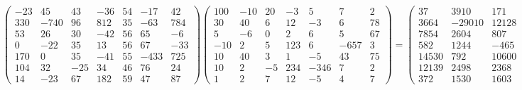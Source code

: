 \documentclass{article}%
\begin{document}
\[%
\begin{pmatrix}%
-23&45&43&-36&54&-17&42\\%
330&-740&96&812&35&-63&784\\%
53&26&30&-42&56&65&-6\\%
0&-22&35&13&56&67&-33\\%
170&0&35&-41&55&-433&725\\%
104&32&-25&34&46&76&24\\%
14&-23&67&182&59&47&87%
\end{pmatrix} \begin{pmatrix}%
100&-10&20&-3&5&7&2\\%
30&40&6&12&-3&6&78\\%
5&-6&0&2&6&5&67\\%
-10&2&5&123&6&-657&3\\%
10&40&3&1&-5&43&75\\%
10&2&-5&234&-346&7&2\\%
1&2&7&12&-5&4&7%
\end{pmatrix} = \begin{pmatrix}%
37&3910&171&-7153&5194&26347&10547\\%
3664&-29010&12128&84899&27021&-530934&-40205\\%
7854&2604&807&10241&-22625&31110&8306\\%
582&1244&-465&16743&-22943&-5753&4771\\%
14530&792&10600&-98050&146732&30536&10896\\%
12139&2498&2368&22322&-26168&-18937&4901\\%
372&1530&1603&34303&-15359&-116065&8397%
\end{pmatrix}%
\]%
\end{document}
